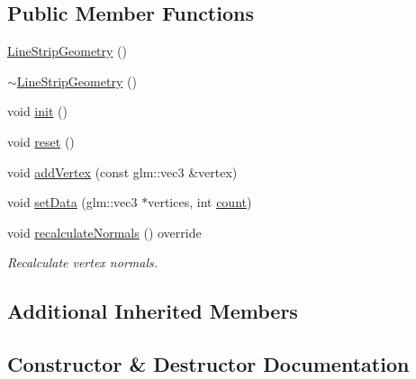 \subsection*{Public Member Functions}
\begin{DoxyCompactItemize}
\item 
\mbox{\hyperlink{classec_1_1_line_strip_geometry_ad93597cb912f407b6e7be3f3d377cc4d}{Line\+Strip\+Geometry}} ()
\item 
\mbox{\hyperlink{classec_1_1_line_strip_geometry_a2fcbc3ebbd2318f00da14dbf7a2c87f3}{$\sim$\+Line\+Strip\+Geometry}} ()
\item 
void \mbox{\hyperlink{classec_1_1_line_strip_geometry_a8dac12c33ec187961ba4ac1573d718a5}{init}} ()
\item 
void \mbox{\hyperlink{classec_1_1_line_strip_geometry_abaf125f40af2b979e4b3af3939bb0a0e}{reset}} ()
\item 
void \mbox{\hyperlink{classec_1_1_line_strip_geometry_a185da594a28585dabc17874a59cfe7ef}{add\+Vertex}} (const glm\+::vec3 \&vertex)
\item 
void \mbox{\hyperlink{classec_1_1_line_strip_geometry_a2649268027055ff190efb0efdc5768a4}{set\+Data}} (glm\+::vec3 $\ast$vertices, int \mbox{\hyperlink{namespaceec_a30e2a743ebdeb02ac68a6cfa50f629c7ae2942a04780e223b215eb8b663cf5353}{count}})
\item 
void \mbox{\hyperlink{classec_1_1_line_strip_geometry_a8b78bf56551a9536f5a2dace78ce4fcd}{recalculate\+Normals}} () override
\begin{DoxyCompactList}\small\item\em Recalculate vertex normals. \end{DoxyCompactList}\end{DoxyCompactItemize}
\subsection*{Additional Inherited Members}


\subsection{Constructor \& Destructor Documentation}
\mbox{\label{classec_1_1_line_strip_geometry_ad93597cb912f407b6e7be3f3d377cc4d}} 
